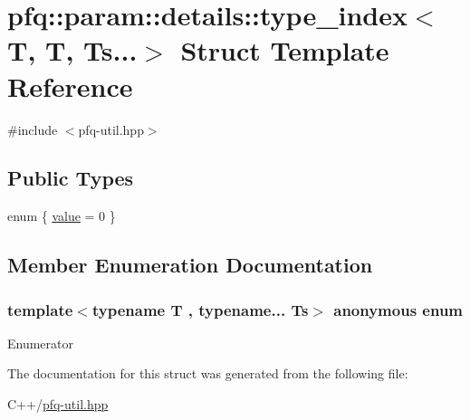 \hypertarget{structpfq_1_1param_1_1details_1_1type__index_3_01T_00_01T_00_01Ts_8_8_8_4}{\section{pfq\+:\+:param\+:\+:details\+:\+:type\+\_\+index$<$ T, T, Ts...$>$ Struct Template Reference}
\label{structpfq_1_1param_1_1details_1_1type__index_3_01T_00_01T_00_01Ts_8_8_8_4}
}


{\ttfamily \#include $<$pfq-\/util.\+hpp$>$}

\subsection*{Public Types}
\begin{DoxyCompactItemize}
\item 
enum \{ \hyperlink{structpfq_1_1param_1_1details_1_1type__index_3_01T_00_01T_00_01Ts_8_8_8_4_a70bbdf1be503b26289fdb2a8b37a7ff9ac49a13caeb8608e4992f438260249dfa}{value} = 0
 \}
\end{DoxyCompactItemize}


\subsection{Member Enumeration Documentation}
\hypertarget{structpfq_1_1param_1_1details_1_1type__index_3_01T_00_01T_00_01Ts_8_8_8_4_a70bbdf1be503b26289fdb2a8b37a7ff9}{\subsubsection[{anonymous enum}]{\setlength{\rightskip}{0pt plus 5cm}template$<$typename T , typename... Ts$>$ anonymous enum}}\label{structpfq_1_1param_1_1details_1_1type__index_3_01T_00_01T_00_01Ts_8_8_8_4_a70bbdf1be503b26289fdb2a8b37a7ff9}
\begin{Desc}
\item[Enumerator]\par
\begin{description}
\item[{\em 
\hypertarget{structpfq_1_1param_1_1details_1_1type__index_3_01T_00_01T_00_01Ts_8_8_8_4_a70bbdf1be503b26289fdb2a8b37a7ff9ac49a13caeb8608e4992f438260249dfa}{value}\label{structpfq_1_1param_1_1details_1_1type__index_3_01T_00_01T_00_01Ts_8_8_8_4_a70bbdf1be503b26289fdb2a8b37a7ff9ac49a13caeb8608e4992f438260249dfa}
}]\end{description}
\end{Desc}


The documentation for this struct was generated from the following file\+:\begin{DoxyCompactItemize}
\item 
C++/\hyperlink{pfq-util_8hpp}{pfq-\/util.\+hpp}\end{DoxyCompactItemize}
